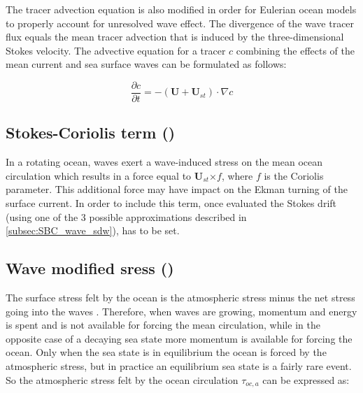 \documentclass[../tex_main/NEMO_manual]{subfiles}
\begin{document}
The tracer advection equation is also modified in order for Eulerian ocean models to properly account 
for unresolved wave effect. The divergence of the wave tracer flux equals the mean tracer advection 
that is induced by the three-dimensional Stokes velocity. 
The advective equation for a tracer $c$ combining the effects of the mean current and sea surface waves 
can be formulated as follows: 

\begin{equation} \label{eq:sbc_wave_tra_sdw}
\frac{\partial{c}}{\partial{t}} = 
- (\mathbf{U} + \mathbf{U}_{st}) \cdot \nabla{c}
\end{equation}


\subsection{Stokes-Coriolis term (\protect{})}
\label{subsec:SBC_wave_stcor}

In a rotating ocean, waves exert a wave-induced stress on the mean ocean circulation which results 
in a force equal to $\mathbf{U}_{st}$×$f$, where $f$ is the Coriolis parameter. 
This additional force may have impact on the Ekman turning of the surface current. 
In order to include this term, once evaluated the Stokes drift (using one of the 3 possible 
approximations described in \autoref{subsec:SBC_wave_sdw}), 
 has to be set.


\subsection{Wave modified sress (\protect{})} 
\label{subsec:SBC_wave_tauw}

The surface stress felt by the ocean is the atmospheric stress minus the net stress going 
into the waves \citep{Janssen_al_TM13}. Therefore, when waves are growing, momentum and energy is spent and is not 
available for forcing the mean circulation, while in the opposite case of a decaying sea 
state more momentum is available for forcing the ocean. 
Only when the sea state is in equilibrium the ocean is forced by the atmospheric stress, 
but in practice an equilibrium sea state is a fairly rare event. 
So the atmospheric stress felt by the ocean circulation $\tau_{oc,a}$ can be expressed as: 
\end{document}
